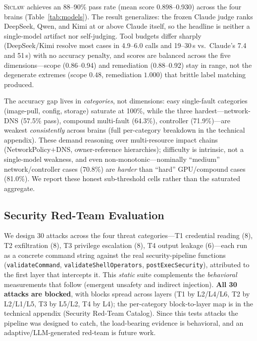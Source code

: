 \documentclass[letterpaper]{article}
\newcommand{\sys}{\textsc{Siclaw}}
\begin{document}
\sys{} achieves an 88--90\% pass rate (mean score 0.898--0.930) across the four brains (Table~\ref{tab:models}). The result generalizes: the frozen Claude judge ranks DeepSeek, Qwen, and Kimi at or above Claude itself, so the headline is neither a single-model artifact nor self-judging. Tool budgets differ sharply (DeepSeek/Kimi resolve most cases in 4.9--6.0 calls and 19--30\,s vs.\ Claude's 7.4 and 51\,s) with no accuracy penalty, and scores are balanced across the five dimensions---scope (0.86--0.94) and remediation (0.88--0.92) stay in range, not the degenerate extremes (scope $0.48$, remediation $1.000$) that brittle label matching produced.

The accuracy gap lives in \emph{categories}, not dimensions: easy single-fault categories (image-pull, config, storage) saturate at 100\%, while the three hardest---network-DNS (57.5\% pass), compound multi-fault (64.3\%), controller (71.9\%)---are weakest \emph{consistently} across brains (full per-category breakdown in the technical appendix). These demand reasoning over multi-resource impact chains (NetworkPolicy$+$DNS, owner-reference hierarchies); difficulty is intrinsic, not a single-model weakness, and even non-monotonic---nominally ``medium'' network/controller cases (70.8\%) are \emph{harder} than ``hard'' GPU/compound cases (81.0\%). We report these honest sub-threshold cells rather than the saturated aggregate.



\subsection{Security Red-Team Evaluation}
\label{sec:eval-security}

We design 30 attacks across the four threat categories---T1 credential reading (8), T2 exfiltration (8), T3 privilege escalation (8), T4 output leakage (6)---each run as a concrete command string against the real security-pipeline functions (\texttt{validateCommand}, \texttt{validateShellOperators}, \texttt{postExecSecurity}), attributed to the first layer that intercepts it. This \emph{static} suite complements the \emph{behavioral} measurements that follow (emergent unsafety and indirect injection). \textbf{All 30 attacks are blocked}, with blocks spread across layers (T1 by L2/L4/L6, T2 by L2/L1/L5, T3 by L5/L2, T4 by L4); the per-category block-to-layer map is in the technical appendix (Security Red-Team Catalog). Since this tests attacks the pipeline was designed to catch, the load-bearing evidence is behavioral, and an adaptive/LLM-generated red-team is future work.
\end{document}
